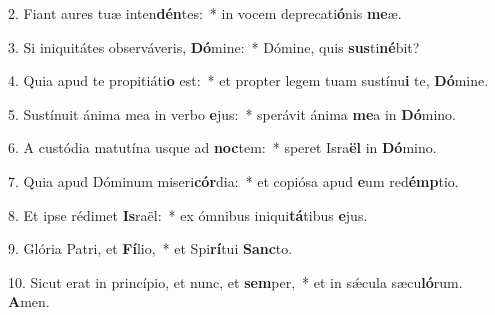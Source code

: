 2. Fiant aures tuæ inten\textbf{dén}tes:~*  in vocem deprecati\textbf{ó}nis \textbf{me}æ.\

3. Si iniquitátes observáveris, \textbf{Dó}mine:~*  Dómine, quis \textbf{sus}ti\textbf{né}bit?\

4. Quia apud te propitiáti\textbf{o} est:~*  et propter legem tuam sustínu\textbf{i} te, \textbf{Dó}mine.\

5. Sustínuit ánima mea in verbo \textbf{e}jus:~*  sperávit ánima \textbf{me}a in \textbf{Dó}mino.\

6. A custódia matutína usque ad \textbf{noc}tem:~*  speret Isra\textbf{ël} in \textbf{Dó}mino.\

7. Quia apud Dóminum miseri\textbf{cór}dia:~*  et copiósa apud \textbf{e}um red\textbf{émp}tio.\

8. Et ipse rédimet \textbf{Is}raël:~*  ex ómnibus iniqui\textbf{tá}tibus \textbf{e}jus.\

9. Glória Patri, et \textbf{Fí}lio,~*  et Spi\textbf{rí}tui \textbf{Sanc}to.\

10. Sicut erat in princípio, et nunc, et \textbf{sem}per,~*  et in sǽcula sæcu\textbf{ló}rum. \textbf{A}men.\

